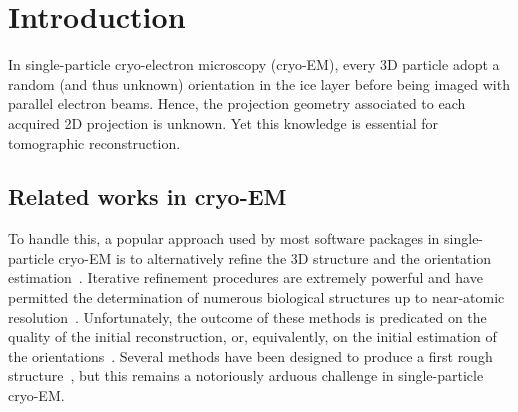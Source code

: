 \section{Introduction}



In single-particle cryo-electron microscopy (cryo-EM), every 3D particle adopt a random (and thus unknown) orientation in the ice layer before being imaged with parallel electron beams.
Hence, the projection geometry associated to each acquired 2D projection is unknown. Yet this knowledge is essential for tomographic reconstruction.


\subsection{Related works in cryo-EM}

To handle this, a popular approach used by most software packages in single-particle cryo-EM is to alternatively refine the 3D structure and the orientation estimation~\cite{penczek1994ribosome,Baker1996,Dempster1977,sigworth1998maximum,scheres2012bayesian}.
Iterative refinement procedures are extremely powerful and have permitted the determination of numerous biological structures up to near-atomic resolution~\cite{kuhlbrandt2014resolution}.
Unfortunately, the outcome of these methods is predicated on the quality of the initial reconstruction, or, equivalently, on the initial estimation of the orientations~\cite{sorzano2006optimization,henderson2012outcome}.
Several methods have been designed to produce a first rough structure~\cite{singer2010detecting,wang2013orientation,greenberg2017common,punjani2017cryosparc,pragier2019common}, but this remains a notoriously arduous challenge in single-particle cryo-EM.


